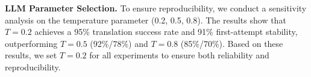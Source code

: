 \documentclass[conference]{IEEEtran}
\begin{document}
\textbf{LLM Parameter Selection. } \label{sec:llm-params}
To ensure reproducibility, we conduct a sensitivity analysis on the temperature parameter (0.2, 0.5, 0.8). 
The results show that $T=0.2$ achieves a 95\% translation success rate and 91\% first-attempt stability, outperforming $T=0.5$ (92\%/78\%) and $T=0.8$ (85\%/70\%). 
Based on these results, we set $T=0.2$ for all experiments to ensure both reliability and reproducibility.

\end{document}
